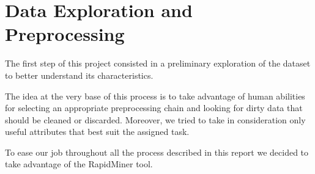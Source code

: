 \section{Data Exploration and Preprocessing}
\label{section:expandpre}
The first step of this project consisted in a preliminary exploration of the dataset to better understand its characteristics.

The idea at the very base of this process is to take advantage of human abilities for selecting an appropriate preprocessing chain and looking for dirty data that should be cleaned or discarded. Moreover, we tried to take in consideration only useful attributes that best suit the assigned task.

To ease our job throughout all the process described in this report we decided to take advantage of the RapidMiner tool.


